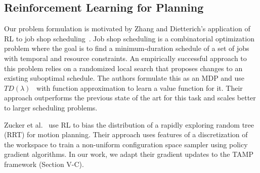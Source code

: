 \subsection{Reinforcement Learning for Planning}
Our problem formulation is motivated by Zhang and Dietterich's application of RL to job
shop scheduling~\cite{JobShopSched}. Job shop scheduling is a combinatorial optimization problem where the goal is to find
a minimum-duration schedule of a set of jobs with temporal and resource constraints. An empirically
successful approach to this problem relies on a randomized local search that proposes changes to an
existing suboptimal schedule. The authors formulate this as an MDP and use $TD(\lambda)$~\cite{suttonbarto} with function
approximation to learn a value function for it. Their approach outperforms the previous state of the art for this task and
scales better to larger scheduling problems.

Zucker et al.~\cite{workspacebias} use RL to bias the distribution of a rapidly exploring random tree (RRT)
for motion planning. Their approach uses features of a discretization of the workspace to train
a non-uniform configuration space sampler using policy gradient algorithms.
In our work, we adapt their gradient updates to the TAMP framework (Section V-C).
